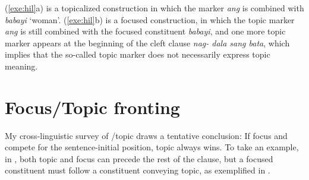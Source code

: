 \noindent (\ref{exe:hil}a) is a topicalized construction in which the
 marker \textit{ang} is combined with \textit{babayi}
`woman'. (\ref{exe:hil}b) is a focused construction, in which the
topic marker \textit{ang} is still combined with the focused
constituent \textit{babayi}, and one more topic marker appears at the
beginning of the cleft clause \textit{nag- dala sang bata}, which
implies that the so-called topic marker does not necessarily express
topic meaning.


\section{Focus/Topic fronting}
\label{5:sec:fronting}



My cross-linguistic survey of /topic  draws a
tentative conclusion: If focus and  compete for the
sentence-initial position, topic always wins.  To take an example, in
, both topic and focus can precede the rest of the clause,
but a focused constituent must follow a constituent conveying topic,
as exemplified in .



